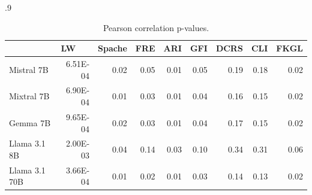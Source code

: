 \begin{table}[!htb]
\centering
    \begin{subtable}{.9\textwidth}
        \centering \footnotesize
        \begin{tabular}{l|rrrrrrrr}
         & \multicolumn{1}{l}{LW} & \multicolumn{1}{l}{Spache} & \multicolumn{1}{l}{FRE} & \multicolumn{1}{l}{ARI} & \multicolumn{1}{l}{GFI} & \multicolumn{1}{l}{DCRS} & \multicolumn{1}{l}{CLI} & \multicolumn{1}{l}{FKGL} \\ \hline
         Mistral 7B & \cellcolor[HTML]{B7E1CD}6.51E-04 & \cellcolor[HTML]{B7E1CD}0.02 & \cellcolor[HTML]{B7E1CD}0.05 & \cellcolor[HTML]{B7E1CD}0.01 & \cellcolor[HTML]{B7E1CD}0.05 & 0.19 & 0.18 & \cellcolor[HTML]{B7E1CD}0.02 \\
        Mixtral 7B & \cellcolor[HTML]{B7E1CD}6.90E-04 & \cellcolor[HTML]{B7E1CD}0.01 & \cellcolor[HTML]{B7E1CD}0.03 & \cellcolor[HTML]{B7E1CD}0.01 & \cellcolor[HTML]{B7E1CD}0.04 & 0.16 & 0.15 & \cellcolor[HTML]{B7E1CD}0.02 \\
        Gemma 7B & \cellcolor[HTML]{B7E1CD}9.65E-04 & \cellcolor[HTML]{B7E1CD}0.02 & \cellcolor[HTML]{B7E1CD}0.03 & \cellcolor[HTML]{B7E1CD}0.01 & \cellcolor[HTML]{B7E1CD}0.04 & 0.17 & 0.15 & \cellcolor[HTML]{B7E1CD}0.02 \\
        Llama 3.1 8B & \cellcolor[HTML]{B7E1CD}2.00E-03 & \cellcolor[HTML]{B7E1CD}0.04 & 0.14 & \cellcolor[HTML]{B7E1CD}0.03 & 0.10 & 0.34 & 0.31 & 0.06 \\
        Llama 3.1 70B & \cellcolor[HTML]{B7E1CD}3.66E-04 & \cellcolor[HTML]{B7E1CD}0.01 & \cellcolor[HTML]{B7E1CD}0.02 & \cellcolor[HTML]{B7E1CD}0.01 & \cellcolor[HTML]{B7E1CD}0.03 & 0.14 & 0.13 & \cellcolor[HTML]{B7E1CD}0.02 \\
        \end{tabular}
        \caption{Pearson correlation p-values.}\label{subtab:pearson-pval}
    \end{subtable}%
    

\end{table}
